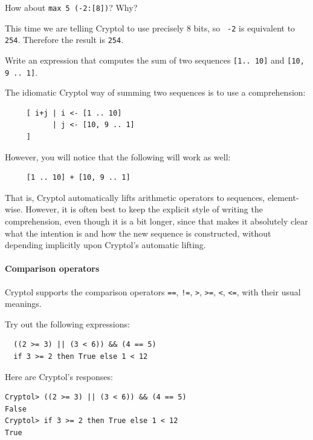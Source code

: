 \begin{Exercise}\label{ex:arith:6}
How about {\tt max 5 (-2:[8])}? Why?\indMin\indModular\indUnaryMinus
\end{Exercise}
\begin{Answer}
  This time we are telling Cryptol to use precisely 8 bits, so {\tt
    -2} is equivalent to {\tt 254}. Therefore the result is {\tt 254}.
\end{Answer}

\begin{Exercise}\label{ex:arith:7}
  Write an expression that computes the sum of two sequences
  \texttt{[1..\ 10]} and \texttt{[10, 9 ..\ 1]}.\indPlus
\end{Exercise}
\begin{Answer}
  The idiomatic Cryptol way of summing two sequences is to use a
  comprehension:\indComp
\begin{Verbatim}
     [ i+j | i <- [1 .. 10]
           | j <- [10, 9 .. 1]
     ]
\end{Verbatim}
However, you will notice that the following will work as well:
\begin{Verbatim}
     [1 .. 10] + [10, 9 .. 1]
\end{Verbatim}
That is, Cryptol automatically lifts arithmetic operators to
sequences, element-wise. However, it is often best to keep the
explicit style of writing the comprehension, even though it is a bit
longer, since that makes it absolutely clear what the intention is and
how the new sequence is constructed, without depending implicitly
upon Cryptol's automatic lifting.\indArithLift
\end{Answer}

\paragraph*{Comparison operators} Cryptol supports the comparison
operators {\tt ==}, {\tt !=}, {\tt >}, {\tt >=}, {\tt <}, {\tt <=},
with their usual meanings.\indEq\indNeq\indGt\indGte\indLt\indLte

\begin{Exercise}\label{ex:arith:8}
Try out the following expressions:
\begin{Verbatim}
  ((2 >= 3) || (3 < 6)) && (4 == 5)
  if 3 >= 2 then True else 1 < 12
\end{Verbatim}
\end{Exercise}
\begin{Answer}
Here are Cryptol's responses:
\begin{Verbatim}
Cryptol> ((2 >= 3) || (3 < 6)) && (4 == 5)
False
Cryptol> if 3 >= 2 then True else 1 < 12
True
\end{Verbatim}
\end{Answer}

